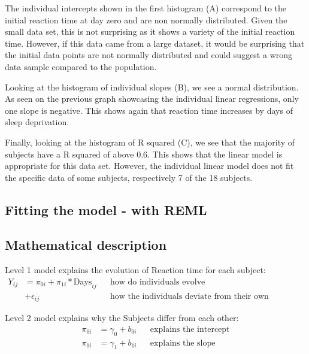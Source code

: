 \documentclass[
]{article}
\begin{document}
The individual intercepts shown in the first histogram (A) correspond to
the initial reaction time at day zero and are non normally distributed.
Given the small data set, this is not surprising as it shows a variety
of the initial reaction time. However, if this data came from a large
dataset, it would be surprising that the initial data points are not
normally distributed and could suggest a wrong data sample compared to
the population.

Looking at the histogram of individual slopes (B), we see a normal
distribution. As seen on the previous graph showcasing the individual
linear regressions, only one slope is negative. This shows again that
reaction time increases by days of sleep deprivation.

Finally, looking at the histogram of R squared (C), we see that the
majority of subjects have a R squared of above 0.6. This shows that the
linear model is appropriate for this data set. However, the individual
linear model does not fit the specific data of some subjects,
respectively 7 of the 18 subjects.

\hypertarget{fitting-the-model---with-reml}{%
\subsection{Fitting the model - with
REML}\label{fitting-the-model---with-reml}}

\hypertarget{mathematical-description}{%
\subsection{Mathematical description}\label{mathematical-description}}

Level 1 model explains the evolution of Reaction time for each subject:
\[\begin{aligned}
Y_{ij}&= \pi_{0i} + \pi_{1i}* \text{Days}_{ij} && \text{how do individuals evolve} \\
          &+ \epsilon_{ij} &&\text{how the individuals deviate from their own evolution}
\end{aligned}\]

Level 2 model explains why the Subjects differ from each other:
\[\begin{aligned}
\pi_{0i} &= \gamma_{0} + b_{0i} && \text{explains the intercept} \\
\pi_{1i} &= \gamma_{1} + b_{1i} && \text{explains the slope}
\end{aligned}\]
\end{document}
